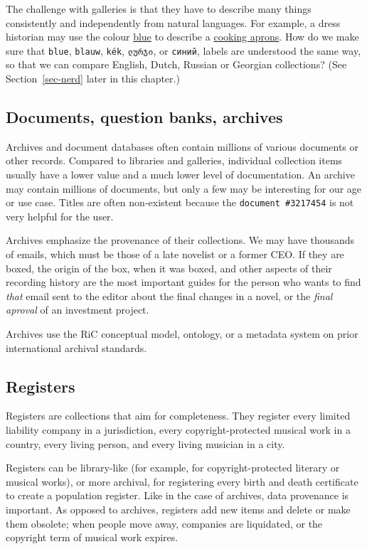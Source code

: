 \documentclass[
  letterpaper,
  DIV=11,
  numbers=noendperiod]{scrreprt}
\begin{document}
The challenge with galleries is that they have to describe many things
consistently and independently from natural languages. For example, a
dress historian may use the colour
\href{http://vocab.getty.edu/page/aat/300129361}{blue} to describe a
\href{http://vocab.getty.edu/page/aat/300422315}{cooking aprons}. How do
we make sure that \texttt{blue}, \texttt{blauw}, \texttt{kék},
\texttt{ლურჯი}, or \texttt{синий}, labels are understood the same way,
so that we can compare English, Dutch, Russian or Georgian collections?
(See Section~\ref{sec-nerd} later in this chapter.)

\subsection{Documents, question banks,
archives}\label{documents-question-banks-archives}

Archives and document databases often contain millions of various
documents or other records. Compared to libraries and galleries,
individual collection items usually have a lower value and a much lower
level of documentation. An archive may contain millions of documents,
but only a few may be interesting for our age or use case. Titles are
often non-existent because the \texttt{document\ \#3217454} is not very
helpful for the user.

Archives emphasize the provenance of their collections. We may have
thousands of emails, which must be those of a late novelist or a former
CEO. If they are boxed, the origin of the box, when it was boxed, and
other aspects of their recording history are the most important guides
for the person who wants to find \emph{that} email sent to the editor
about the final changes in a novel, or the \emph{final aproval} of an
investment project.

Archives use the RiC conceptual model, ontology, or a metadata system on
prior international archival standards.

\subsection{Registers}\label{sec-collections-registers}

Registers are collections that aim for completeness. They register every
limited liability company in a jurisdiction, every copyright-protected
musical work in a country, every living person, and every living
musician in a city.

Registers can be library-like (for example, for copyright-protected
literary or musical works), or more archival, for registering every
birth and death certificate to create a population register. Like in the
case of archives, data provenance is important. As opposed to archives,
registers add new items and delete or make them obsolete; when people
move away, companies are liquidated, or the copyright term of musical
work expires.
\end{document}
